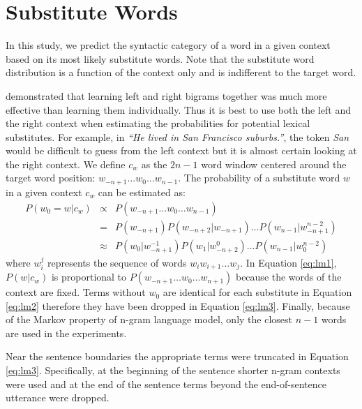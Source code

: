 \section{Substitute Words}
\label{sec:substitute_vectors}

In this study, we predict the syntactic category of a word in a given
context based on its most likely substitute words.  Note that the
substitute word distribution is a function of the context only and is
indifferent to the target word.

\cite{clair2010} demonstrated that learning left and right bigrams
together was much more effective than learning them individually.
Thus it is best to use both the left and the right context when
estimating the probabilities for potential lexical substitutes.  For
example, in \emph{``He lived in San Francisco suburbs.''}, the token
\emph{San} would be difficult to guess from the left context but it is
almost certain looking at the right context.  We define $c_w$ as the
$2n-1$ word window centered around the target word position: $w_{-n+1}
\ldots w_0 \ldots w_{n-1}$.  The probability of a substitute word $w$
in a given context $c_w$ can be estimated as:
\begin{eqnarray}
  \label{eq:lm1}P(w_0 = w | c_w) & \propto & P(w_{-n+1}\ldots w_0\ldots w_{n-1})\\
  \label{eq:lm2}& = & P(w_{-n+1})P(w_{-n+2}|w_{-n+1})\ldots P(w_{n-1}|w_{-n+1}^{n-2})\\
  \label{eq:lm3}& \approx & P(w_0| w_{-n+1}^{-1})P(w_{1}|w_{-n+2}^0)\ldots P(w_{n-1}|w_0^{n-2})
\end{eqnarray}
where $w_i^j$ represents the sequence of words $w_i w_{i+1} \ldots
w_{j}$.  In Equation \ref{eq:lm1}, $P(w|c_w)$ is proportional to
$P(w_{-n+1}\ldots w_0 \ldots w_{n+1})$ because the words of the
context are fixed.  Terms without $w_0$ are identical for each
substitute in Equation \ref{eq:lm2} therefore they have been dropped
in Equation \ref{eq:lm3}.  Finally, because of the Markov property of
n-gram language model, only the closest $n-1$ words are used in the
experiments.

Near the sentence boundaries the appropriate terms were truncated in
Equation \ref{eq:lm3}.  Specifically, at the beginning of the sentence
shorter n-gram contexts were used and at the end of the sentence terms
beyond the end-of-sentence utterance were dropped.  

